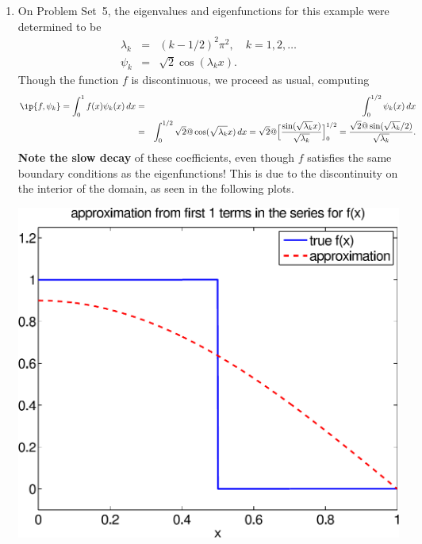 {\begin{solution}
\begin{enumerate}
\item On Problem Set~5, the eigenvalues and eigenfunctions for this example
      were determined to be
     \begin{eqnarray*} \lambda_k &=& (k-1/2)^2 \pi^2, \quad k = 1, 2, \ldots \\[0.5em]
                        \psi_k &=& \sqrt{2} \cos(\lambda_k x).
      \end{eqnarray*}
Though the function $f$ is discontinuous, we proceed as usual, computing
\begin{eqnarray*}
     \ip{f,\psi_k} = \int_0^1 f(x) \psi_k(x)\,dx  
                &=& \int_0^{1/2} \psi_k(x)\,dx \\
                &=& \int_0^{1/2} \sqrt{2}@\cos(\sqrt{\lambda_k} x)\,dx 
                = \sqrt{2}@\Big[{\sin(\sqrt{\lambda_k} x) 
                                   \over \sqrt{\lambda_k}}\Big]_0^{1/2} 
                = {\sqrt{2}@\sin(\sqrt{\lambda_k}/2)\over \sqrt{\lambda_k}}.
\end{eqnarray*}
\textbf{Note the slow decay} of these coefficients, even though $f$ satisfies
the same boundary conditions as the eigenfunctions!  This is due to the 
discontinuity on the interior of the domain, as seen in the following plots.
\begin{center}
   \includegraphics[scale=0.4]{bvps3_1b}\quad

\end{center}
\end{enumerate}
\end{solution}}
